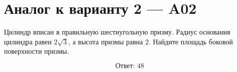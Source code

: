 \documentclass[12pt,a4paper]{article}
\begin{document}
\section*{Аналог к варианту 2 — A02}

Цилиндр вписан в правильную шестиугольную призму. Радиус основания цилиндра равен \(2\sqrt3\), а высота призмы равна \(2\). Найдите площадь боковой поверхности призмы.

\begin{center}
\end{center}

\[
\boxed{\text{Ответ: }48}
\]
\end{document}
